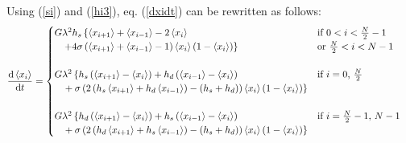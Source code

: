 \documentclass[12pt]{article}
\begin{document}
Using (\ref{si}) and (\ref{hi3}), eq. (\ref{dxidt}) can be rewritten as follows:
\begin{align*}
\frac{\mathrm d\left\langle x_i \right\rangle}{\mathrm dt} &=
 \begin{cases}
G \lambda^2 h_s \left\lbrace \left\langle x_{i+1} \right\rangle + \left\langle x_{i-1} \right\rangle  -  2\left\langle x_i \right\rangle \right.   & \text{if $0<i<\frac{N}{2}-1$}
%
%
 \\ \phantom{bl} \left. + 4\sigma \left( \left\langle x_{i+1} \right\rangle + \left\langle x_{i-1} \right\rangle -1 \right) \left\langle x_i \right\rangle \left(1- \left\langle x_i \right\rangle \right) \right\rbrace &\text{or $\frac{N}{2} < i < N-1 $}
 \\ \quad & \quad
 \\ G \lambda^2 \left\lbrace h_s \left( \left\langle x_{i+1} \right\rangle -  \left\langle x_{i} \right\rangle \right)  + h_d \left( \left\langle x_{i-1} \right\rangle -  \left\langle x_{i} \right\rangle \right) \right. & \text{if $i = 0$, $ \frac{N}{2}$} 
 \\ \left. \phantom{bl} + \sigma \left( 2\left( h_s \left\langle x_{i+1} \right\rangle + h_d \left\langle x_{i-1} \right\rangle  \right) - \left(h_s + h_d \right) \right)\left\langle x_i \right\rangle \left(1- \left\langle x_i \right\rangle \right) \right\rbrace & \quad
 \\ \quad & \quad 
\\ G \lambda^2 \left\lbrace h_d \left( \left\langle x_{i+1} \right\rangle -  \left\langle x_{i} \right\rangle \right)  + h_s \left( \left\langle x_{i-1} \right\rangle -  \left\langle x_{i} \right\rangle \right) \right. & \text{if $i = \frac{N}{2}-1$, $ N-1$} 
 \\ \left. \phantom{bl} + \sigma \left( 2\left( h_d \left\langle x_{i+1} \right\rangle + h_s \left\langle x_{i-1} \right\rangle  \right) - \left(h_s + h_d \right) \right) \left\langle x_i \right\rangle \left(1- \left\langle x_i \right\rangle \right) \right\rbrace & \quad
\end{cases}
\end{align*}
\end{document}
